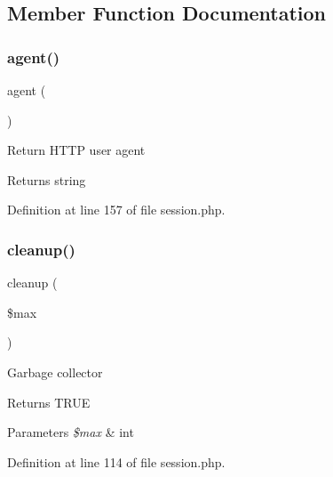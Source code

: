 \subsection{Member Function Documentation}
\hypertarget{class_d_b_1_1_mongo_1_1_session_a77f6a261d70e66c7b7273774832482dc}{}\label{class_d_b_1_1_mongo_1_1_session_a77f6a261d70e66c7b7273774832482dc} 
\subsubsection{\texorpdfstring{agent()}{agent()}}
{\footnotesize\ttfamily agent (\begin{DoxyParamCaption}{ }\end{DoxyParamCaption})}

Return H\+T\+TP user agent \begin{DoxyReturn}{Returns}
string 
\end{DoxyReturn}


Definition at line 157 of file session.\+php.

\hypertarget{class_d_b_1_1_mongo_1_1_session_a60b027eb0df6d42b8fe2ec8c93cfbbae}{}\label{class_d_b_1_1_mongo_1_1_session_a60b027eb0df6d42b8fe2ec8c93cfbbae} 
\subsubsection{\texorpdfstring{cleanup()}{cleanup()}}
{\footnotesize\ttfamily cleanup (\begin{DoxyParamCaption}\item[{}]{\$max }\end{DoxyParamCaption})}

Garbage collector \begin{DoxyReturn}{Returns}
T\+R\+UE 
\end{DoxyReturn}

\begin{DoxyParams}{Parameters}
{\em \$max} & int \\
\hline
\end{DoxyParams}


Definition at line 114 of file session.\+php.

\hypertarget{class_d_b_1_1_mongo_1_1_session_aa69c8bf1f1dcf4e72552efff1fe3e87e}{}\label{class_d_b_1_1_mongo_1_1_session_aa69c8bf1f1dcf4e72552efff1fe3e87e} 

